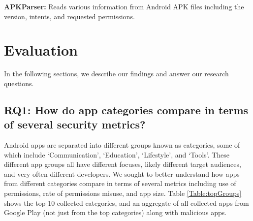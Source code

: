 \documentclass{llncs}
\begin{document}
\textbf{APKParser:} Reads various information from Android APK files including the version, intents, and requested permissions.





\section{Evaluation}
\label{sec: evaluation}

In the following sections, we describe our findings and answer our research questions.

\subsection{RQ1: How do app categories compare in terms of several security metrics?}

Android apps are separated into different groups known as categories, some of which include `Communication', `Education', `Lifestyle', and `Tools'. These different app groups all have different focuses, likely different target audiences, and very often different developers. We sought to better understand how apps from different categories compare in terms of several metrics including use of permissions, rate of permissions misuse, and app size. Table \ref{Table:topGroups} shows the top 10 collected categories, and an aggregate of all collected apps from Google Play (not just from the top categories) along with malicious apps.

\end{document}
